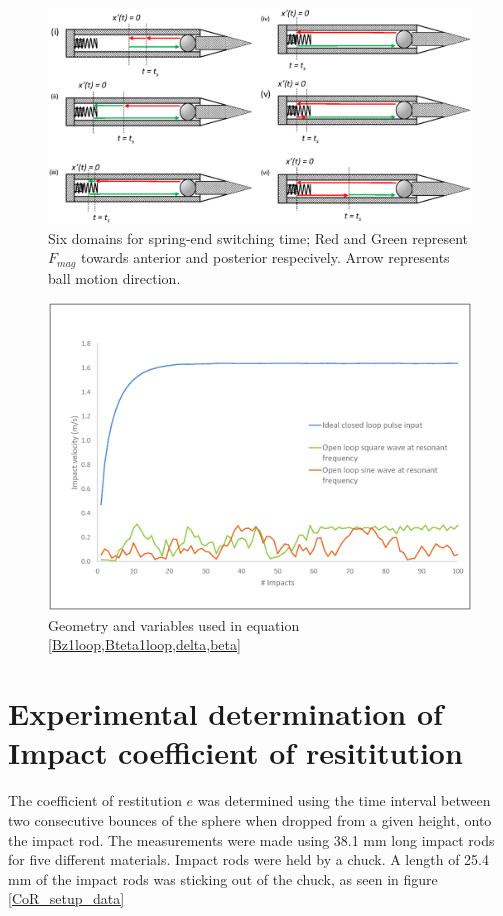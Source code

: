 \documentclass[letterpaper, 10 pt, conference]{ieeeconf}  %
\begin{document}
\begin{figure}
	\includegraphics[width=\linewidth]{Tswitch_cases_1to6.eps}
	\caption{Six domains for spring-end switching time; Red and Green represent $F_{mag}$ towards anterior and posterior respecively. Arrow represents ball motion direction.}
	\label{Tswitch}
\end{figure}


\begin{figure}
  \includegraphics[width=\linewidth]{close_vs_open_loop.eps}
  \caption{Geometry and variables used in equation \cref{Bz1loop,Bteta1loop,delta,beta}}
  \label{close_vs_open_loop}
\end{figure}


\section{Experimental determination of Impact coefficient of resititution}
\label{cor_det}
The coefficient of restitution $e$ was determined using the time interval between two consecutive bounces of the sphere when dropped from a given height, onto the impact rod. The measurements were made using 38.1 mm long impact rods for five different materials. Impact rods were held by a chuck. A length of 25.4 mm of the impact rods was sticking out of the chuck, as seen in figure \ref{CoR_setup_data}
\end{document}
